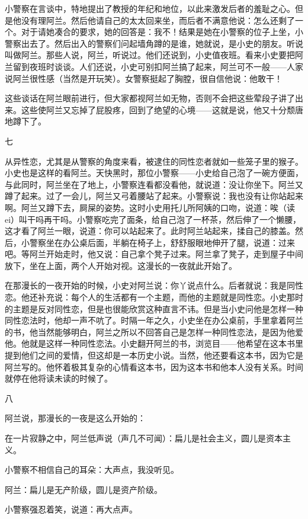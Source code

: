 小警察在言谈中，特地提出了教授的年纪和地位，以此来激发后者的羞耻之心。但是他没有理阿兰。然后他请自己的太太回来坐，而后者不满意他说：怎么还剩了一个。对于请她凑合的要求，她的回答是：我不！结果是她在小警察的位子上坐，小警察出去了。然后出入的警察们问起墙角蹲的是谁，她就说，是小史的朋友。听说叫做阿兰。那些人说，阿兰，听说过。他们还说到，小史值夜班。看来小史要把阿兰留到夜班时谈谈。人们还说，小史可别扣阿兰搞了起来，阿兰可不一般——人家说阿兰很性感（当然是开玩笑）。女警察挺起了胸膛，很自信他说：他敢干！ 

这些谈话在阿兰眼前进行，但大家都视阿兰如无物，否则不会把这些荤段子讲了出来。这些使阿兰又忘掉了屁股疼，回到了绝望的心境——这就是说，他又十分颓唐地蹲下了。 

七 

从异性恋，尤其是从警察的角度来看，被逮住的同性恋者就如一些笼子里的猴子。小史也是这样的看阿兰。天快黑时，那位小警察——小史给自己泡了一碗方便面，与此同时，阿兰坐在了地上，小警察连看都没看他，就说道：没让你坐下。阿兰又蹲了起来。过了一会儿，阿兰又弓着腰站了起来。小警察说：我也没有让你站起来啊。阿兰又蹲下去，屙屎的姿势。这时小史用托儿所阿姨的口吻，说道：唉（读ei）叫干吗再干吗。小警察吃完了面条，给自己泡了一杯茶，然后伸了一个懒腰，这才看了阿兰一眼，说道：你可以站起来了。此时阿兰站起来，揉自己的膝盖。然后，小警察坐在办公桌后面，半躺在椅子上，舒舒服眼地伸开了腿，说道：过来吧。等阿兰开始走时，他又说：自己拿个凳子过来。阿兰拿了凳子，走到屋子中间放下，坐在上面，两个人开始对视。这漫长的一夜就此开始了。 

在那漫长的一夜开始的时候，小史对阿兰说：你丫说点什么。后者就说：我是同性恋。他还补充说：每个人的生活都有一个主题，而他的主题就是同性恋。小史那时的主题是反对同性恋，但是也很能欣赏这种直言不讳。但是当小史问他是怎样一种同性恋法时，他却一声不吭了。时隔一年之久，小史坐在办公桌前，手里拿着阿兰的书，他当然能够明白，阿兰之所以不回答自己是怎样一种同性恋法，是因为他爱他。他就是这样一种同性恋法。小史翻开阿兰的书，浏览目——他希望在这本书里提到他们之间的爱情，但这却是一本历史小说。当然，他还要看这本书，因为它是阿兰写的。他怀着极其复杂的心情看这本书，因为这本书和他本人没有关系。时间就停在他将读未读的时候了。 

八 

阿兰说，那漫长的一夜是这么开始的： 

在一片寂静之中，阿兰低声说（声几不可闻）：扁儿是社会主义，圆儿是资本主义。 

小警察不相信自己的耳朵：大声点，我没听见。 

阿兰：扁儿是无产阶级，圆儿是资产阶级。 

小警察强忍着笑，说道：再大点声。 

